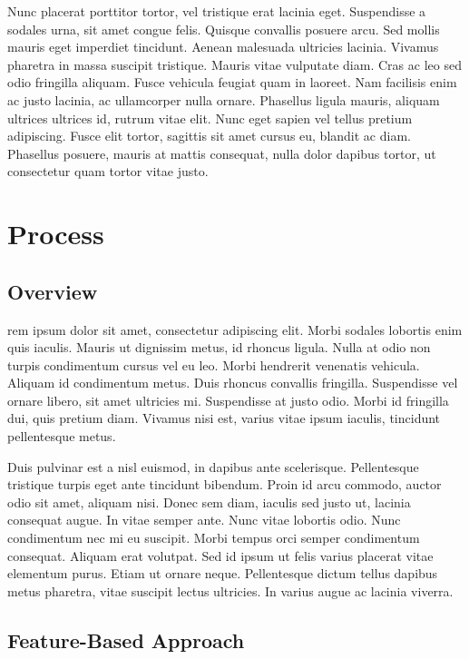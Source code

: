 \documentclass[final,5p,times,twocolumn]{elsarticle}
\begin{document}
Nunc placerat porttitor tortor, vel tristique erat lacinia eget. Suspendisse a
sodales urna, sit amet congue felis. Quisque convallis posuere arcu. Sed mollis
mauris eget imperdiet tincidunt. Aenean malesuada ultricies lacinia. Vivamus
pharetra in massa suscipit tristique. Mauris vitae vulputate diam. Cras ac leo
sed odio fringilla aliquam. Fusce vehicula feugiat quam in laoreet. Nam
facilisis enim ac justo lacinia, ac ullamcorper nulla ornare. Phasellus ligula
mauris, aliquam ultrices ultrices id, rutrum vitae elit. Nunc eget sapien vel
tellus pretium adipiscing. Fusce elit tortor, sagittis sit amet cursus eu,
blandit ac diam. Phasellus posuere, mauris at mattis consequat, nulla dolor
dapibus tortor, ut consectetur quam tortor vitae justo.

\section{Process}
\label{process}

\subsection{Overview}
\label{process:overview}
rem ipsum dolor sit amet, consectetur adipiscing elit. Morbi sodales lobortis
enim quis iaculis. Mauris ut dignissim metus, id rhoncus ligula. Nulla at odio
non turpis condimentum cursus vel eu leo. Morbi hendrerit venenatis vehicula.
Aliquam id condimentum metus. Duis rhoncus convallis fringilla. Suspendisse vel
ornare libero, sit amet ultricies mi. Suspendisse at justo odio. Morbi id
fringilla dui, quis pretium diam. Vivamus nisi est, varius vitae ipsum iaculis,
tincidunt pellentesque metus.

Duis pulvinar est a nisl euismod, in dapibus ante scelerisque. Pellentesque
tristique turpis eget ante tincidunt bibendum. Proin id arcu commodo, auctor
odio sit amet, aliquam nisi. Donec sem diam, iaculis sed justo ut, lacinia
consequat augue. In vitae semper ante. Nunc vitae lobortis odio. Nunc
condimentum nec mi eu suscipit. Morbi tempus orci semper condimentum consequat.
Aliquam erat volutpat. Sed id ipsum ut felis varius placerat vitae elementum
purus. Etiam ut ornare neque. Pellentesque dictum tellus dapibus metus
pharetra, vitae suscipit lectus ultricies. In varius augue ac lacinia viverra.

\subsection{Feature-Based Approach}
\label{process:featurebased}
\end{document}

